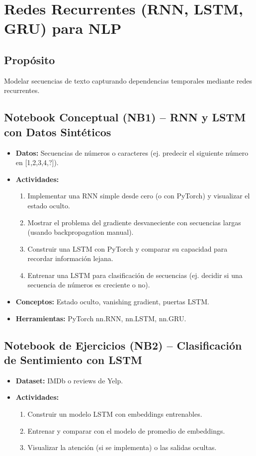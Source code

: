 \documentclass[12pt,a4paper]{article}
\begin{document}
\section{Redes Recurrentes (RNN, LSTM, GRU) para NLP}
\subsection*{Propósito}
Modelar secuencias de texto capturando dependencias temporales mediante redes recurrentes.

\subsection*{Notebook Conceptual (NB1) – RNN y LSTM con Datos Sintéticos}
\begin{itemize}
    \item \textbf{Datos:} Secuencias de números o caracteres (ej. predecir el siguiente número en [1,2,3,4,?]).
    \item \textbf{Actividades:}
    \begin{enumerate}
        \item Implementar una RNN simple desde cero (o con PyTorch) y visualizar el estado oculto.
        \item Mostrar el problema del gradiente desvaneciente con secuencias largas (usando backpropagation manual).
        \item Construir una LSTM con PyTorch y comparar su capacidad para recordar información lejana.
        \item Entrenar una LSTM para clasificación de secuencias (ej. decidir si una secuencia de números es creciente o no).
    \end{enumerate}
    \item \textbf{Conceptos:} Estado oculto, vanishing gradient, puertas LSTM.
    \item \textbf{Herramientas:} PyTorch nn.RNN, nn.LSTM, nn.GRU.
\end{itemize}

\subsection*{Notebook de Ejercicios (NB2) – Clasificación de Sentimiento con LSTM}
\begin{itemize}
    \item \textbf{Dataset:} IMDb o reviews de Yelp.
    \item \textbf{Actividades:}
    \begin{enumerate}
        \item Construir un modelo LSTM con embeddings entrenables.
        \item Entrenar y comparar con el modelo de promedio de embeddings.
        \item Visualizar la atención (si se implementa) o las salidas ocultas.
    \end{enumerate}
\end{itemize}
\end{document}
